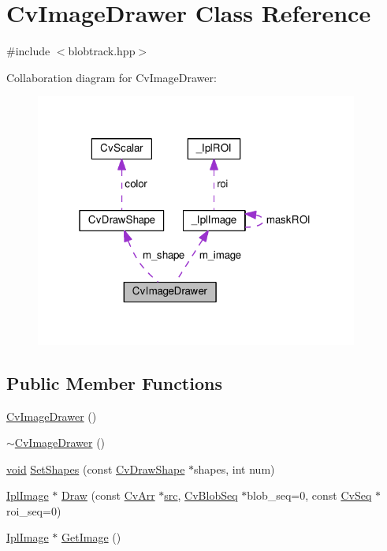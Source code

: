 \hypertarget{classCvImageDrawer}{\section{Cv\-Image\-Drawer Class Reference}
\label{classCvImageDrawer}
}


{\ttfamily \#include $<$blobtrack.\-hpp$>$}



Collaboration diagram for Cv\-Image\-Drawer\-:\nopagebreak
\begin{figure}[H]
\begin{center}
\leavevmode
\includegraphics[width=301pt]{classCvImageDrawer__coll__graph}
\end{center}
\end{figure}
\subsection*{Public Member Functions}
\begin{DoxyCompactItemize}
\item 
\hyperlink{classCvImageDrawer_ab0d6d1ab7314e4db34507f5c5b5fd787}{Cv\-Image\-Drawer} ()
\item 
\hyperlink{classCvImageDrawer_a70fac9bee57c7d3305b2986695fbc9b3}{$\sim$\-Cv\-Image\-Drawer} ()
\item 
\hyperlink{legacy_8hpp_a8bb47f092d473522721002c86c13b94e}{void} \hyperlink{classCvImageDrawer_a70ae26967909524bd0874e4a561802be}{Set\-Shapes} (const \hyperlink{structCvDrawShape}{Cv\-Draw\-Shape} $\ast$shapes, int num)
\item 
\hyperlink{core_2types__c_8h_a249298f383f3b430b476542076320c57}{Ipl\-Image} $\ast$ \hyperlink{classCvImageDrawer_ada56f9ce437c1dc8e51c3ddfb08d34bf}{Draw} (const \hyperlink{core_2types__c_8h_ac5046bc0456e9295d80b37774384798c}{Cv\-Arr} $\ast$\hyperlink{legacy_8hpp_a371cd109b74033bc4366f584edd3dacc}{src}, \hyperlink{classCvBlobSeq}{Cv\-Blob\-Seq} $\ast$blob\-\_\-seq=0, const \hyperlink{structCvSeq}{Cv\-Seq} $\ast$roi\-\_\-seq=0)
\item 
\hyperlink{core_2types__c_8h_a249298f383f3b430b476542076320c57}{Ipl\-Image} $\ast$ \hyperlink{classCvImageDrawer_a6197400e9360b6bab57bf2e35f2ef7b2}{Get\-Image} ()
\end{DoxyCompactItemize}
